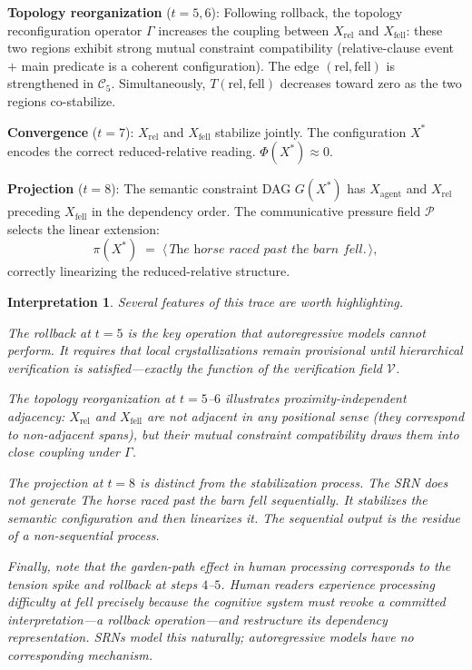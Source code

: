\documentclass[11pt, a4paper]{article}
\theoremstyle{srn}
\theoremstyle{srnremark}
\newtheorem{interpretation}{Interpretation}[section]
\newcommand{\Cstruct}{\mathcal{C}}           %
\newcommand{\Gop}{\Gamma}              %
\newcommand{\Phiten}{\varPhi}            %
\begin{document}
\medskip
\noindent
\textbf{Topology reorganization} ($t = 5, 6$):
Following rollback, the topology reconfiguration operator $\Gop$
increases the coupling between $X_{\mathrm{rel}}$ and
$X_{\mathrm{fell}}$: these two regions exhibit strong mutual
constraint compatibility (relative-clause event $+$ main predicate is
a coherent configuration).
The edge $(\mathrm{rel}, \mathrm{fell})$ is strengthened in
$\Cstruct_5$.
Simultaneously, $T(\mathrm{rel}, \mathrm{fell})$ decreases toward
zero as the two regions co-stabilize.

\medskip
\noindent
\textbf{Convergence} ($t = 7$):
$X_{\mathrm{rel}}$ and $X_{\mathrm{fell}}$ stabilize jointly.
The configuration $X^*$ encodes the correct reduced-relative reading.
$\Phiten(X^*) \approx 0$.

\medskip
\noindent
\textbf{Projection} ($t = 8$):
The semantic constraint DAG $G(X^*)$ has $X_{\mathrm{agent}}$ and
$X_{\mathrm{rel}}$ preceding $X_{\mathrm{fell}}$ in the dependency
order.
The communicative pressure field $\mathcal{P}$ selects the linear
extension:
\[
  \pi(X^*)
  \;=\;
  \langle\,
  \textit{The horse raced past the barn fell.}\,
  \rangle,
\]
correctly linearizing the reduced-relative structure.

\begin{interpretation}
Several features of this trace are worth highlighting.

The rollback at $t = 5$ is the key operation that autoregressive
models cannot perform.
It requires that local crystallizations remain \emph{provisional}
until hierarchical verification is satisfied---exactly the function of
the verification field $\mathcal{V}$.

The topology reorganization at $t = 5$--$6$ illustrates proximity-independent
adjacency: $X_{\mathrm{rel}}$ and $X_{\mathrm{fell}}$ are not
adjacent in any positional sense (they correspond to non-adjacent
spans), but their mutual constraint compatibility draws them into close
coupling under $\Gop$.

The projection at $t = 8$ is distinct from the stabilization process.
The SRN does not generate \textit{The horse raced past the barn fell}
sequentially.
It stabilizes the semantic configuration and then linearizes it.
The sequential output is the residue of a non-sequential process.

Finally, note that the garden-path effect in human processing
corresponds to the tension spike and rollback at steps $4$--$5$.
Human readers experience processing difficulty at \textit{fell}
precisely because the cognitive system must revoke a committed
interpretation---a rollback operation---and restructure its dependency
representation.
SRNs model this naturally; autoregressive models have no corresponding
mechanism.
\end{interpretation}
\end{document}
